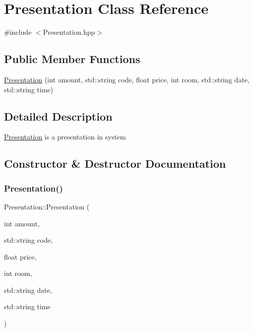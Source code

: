 \hypertarget{class_presentation}{}\section{Presentation Class Reference}
\label{class_presentation}


{\ttfamily \#include $<$Presentation.\+hpp$>$}

\subsection*{Public Member Functions}
\begin{DoxyCompactItemize}
\item 
\mbox{\hyperlink{class_presentation_ac78a038a384cb26f54934bef19c8c2cc}{Presentation}} (int amount, std\+::string code, float price, int room, std\+::string date, std\+::string time)
\end{DoxyCompactItemize}


\subsection{Detailed Description}
\mbox{\hyperlink{class_presentation}{Presentation}} is a presentation in system 

\subsection{Constructor \& Destructor Documentation}
\mbox{\label{class_presentation_ac78a038a384cb26f54934bef19c8c2cc}} 
\subsubsection{\texorpdfstring{Presentation()}{Presentation()}}
{\footnotesize\ttfamily Presentation\+::\+Presentation (\begin{DoxyParamCaption}\item[{int}]{amount,  }\item[{std\+::string}]{code,  }\item[{float}]{price,  }\item[{int}]{room,  }\item[{std\+::string}]{date,  }\item[{std\+::string}]{time }\end{DoxyParamCaption})}

